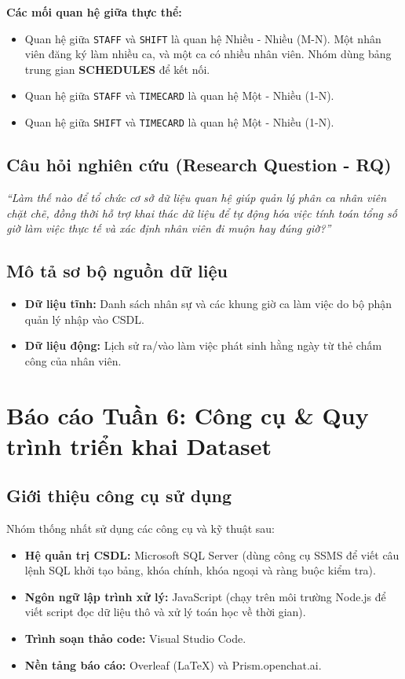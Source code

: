 \documentclass[12pt,a4paper]{article}
\begin{document}
\noindent \textbf{Các mối quan hệ giữa thực thể:}
\begin{itemize}
    \item Quan hệ giữa \texttt{STAFF} và \texttt{SHIFT} là quan hệ Nhiều - Nhiều (M-N). Một nhân viên đăng ký làm nhiều ca, và một ca có nhiều nhân viên. Nhóm dùng bảng trung gian \textbf{SCHEDULES} để kết nối.
    \item Quan hệ giữa \texttt{STAFF} và \texttt{TIMECARD} là quan hệ Một - Nhiều (1-N).
    \item Quan hệ giữa \texttt{SHIFT} và \texttt{TIMECARD} là quan hệ Một - Nhiều (1-N).
\end{itemize}

\subsection{Câu hỏi nghiên cứu (Research Question - RQ)}
\textit{“Làm thế nào để tổ chức cơ sở dữ liệu quan hệ giúp quản lý phân ca nhân viên chặt chẽ, đồng thời hỗ trợ khai thác dữ liệu để tự động hóa việc tính toán tổng số giờ làm việc thực tế và xác định nhân viên đi muộn hay đúng giờ?”}

\subsection{Mô tả sơ bộ nguồn dữ liệu}
\begin{itemize}
    \item \textbf{Dữ liệu tĩnh:} Danh sách nhân sự và các khung giờ ca làm việc do bộ phận quản lý nhập vào CSDL.
    \item \textbf{Dữ liệu động:} Lịch sử ra/vào làm việc phát sinh hằng ngày từ thẻ chấm công của nhân viên.
\end{itemize}

\section{Báo cáo Tuần 6: Công cụ \& Quy trình triển khai Dataset}

\subsection{Giới thiệu công cụ sử dụng}
Nhóm thống nhất sử dụng các công cụ và kỹ thuật sau:
\begin{itemize}
    \item \textbf{Hệ quản trị CSDL:} Microsoft SQL Server (dùng công cụ SSMS để viết câu lệnh SQL khởi tạo bảng, khóa chính, khóa ngoại và ràng buộc kiểm tra).
    \item \textbf{Ngôn ngữ lập trình xử lý:} JavaScript (chạy trên môi trường Node.js để viết script đọc dữ liệu thô và xử lý toán học về thời gian).
    \item \textbf{Trình soạn thảo code:} Visual Studio Code.
    \item \textbf{Nền tảng báo cáo:} Overleaf (LaTeX) và Prism.openchat.ai.
\end{itemize}
\end{document}
